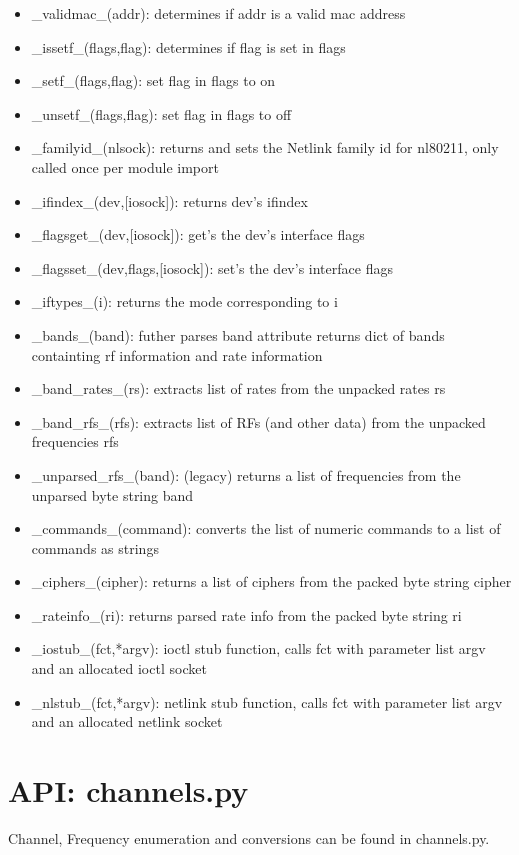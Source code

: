 \documentclass[11pt]{article}
\begin{document}
\begin{appendices}
\begin{itemize}
\begin{itemize}
\item \_validmac\_(addr): determines if addr is a valid mac address
\item \_issetf\_(flags,flag): determines if flag is set in flags
\item \_setf\_(flags,flag): set flag in flags to on
\item \_unsetf\_(flags,flag): set flag in flags to off
\item \_familyid\_(nlsock): returns and sets the Netlink family id for nl80211, 
only called once per module import
\item \_ifindex\_(dev,[iosock]): returns dev's ifindex
\item \_flagsget\_(dev,[iosock]): get's the dev's interface flags
\item \_flagsset\_(dev,flags,[iosock]): set's the dev's interface flags
\item \_iftypes\_(i): returns the mode corresponding to i
\item \_bands\_(band): futher parses band attribute returns dict of bands 
containting rf information and rate information
\item \_band\_rates\_(rs): extracts list of rates from the unpacked rates rs
\item \_band\_rfs\_(rfs): extracts list of RFs (and other data) from the unpacked
frequencies rfs
\item \_unparsed\_rfs\_(band): (legacy) returns a list of frequencies from the 
unparsed byte string band
\item \_commands\_(command): converts the list of numeric commands to a list of
commands as strings 
\item \_ciphers\_(cipher): returns a list of ciphers from the packed byte string
cipher
\item \_rateinfo\_(ri): returns parsed rate info from the packed byte string ri
\item \_iostub\_(fct,*argv): ioctl stub function, calls fct with parameter list 
argv and an allocated ioctl socket
\item \_nlstub\_(fct,*argv): netlink stub function, calls fct with parameter list
argv and an allocated netlink socket
\end{itemize}
\end{itemize}

\section{API: channels.py}\label{sec:channels.api}
Channel, Frequency enumeration and conversions can be found in channels.py.


\end{appendices}
\end{document}
